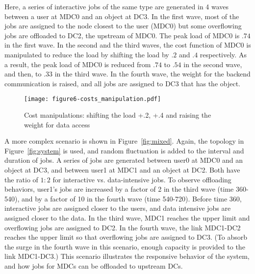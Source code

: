 Here, a series of interactive jobs of the same type are generated in
4 waves between a user at MDC0 and an object at DC3.
In the first wave,  most of the jobs are assigned to the node closest
to the user (MDC0) but some overflowing jobs are offloaded to DC2, the
upstream of MDC0.
The peak load of MDC0 is $.74$ in the first wave.
In the second and the third waves, the cost function of MDC0 is
manipulated to reduce the load by shifting the load by $.2$ and $.4$
respectively. As a result, the peak load of MDC0 is
reduced from $.74$ to $.54$ in the second wave, and then, to $.33$ in the
third wave.
In the fourth wave, the weight for the backend communication is
raised, and all jobs are assigned to DC3 that has the object.

\begin{figure}[tb]
  \begin{center}
    \texttt{[image: figure6-costs\_manipulation.pdf]}
    \vspace{-4.0ex}
    \caption{Cost manipulations: shifting the load +.2,
      +.4 and raising the weight for data access}
    \smallskip
    \raggedright
    \small
    \label{fig:lowering}
  \end{center}
\end{figure}


A more complex scenario is shown in Figure~\ref{fig:mixed}.
Again, the topology in Figure~\ref{fig:system} is used, and
random fluctuation is added to the interval and duration of jobs.
A series of jobs are generated
between user0 at MDC0 and an object at DC3, and
between user1 at MDC1 and an object at DC2.
Both have the ratio of $1:2$ for interactive vs. data-intensive jobs.
To observe offloading behaviors, user1's jobs are increased by a
factor of 2 in the third wave (time 360-540), and by a factor of 10 in
the fourth wave (time 540-720).
Before time 360, interactive jobs are assigned closer to the users,
and data intensive jobs are assigned closer to the data.
In the third wave, MDC1 reaches the upper limit and overflowing jobs are
assigned to DC2.
In the fourth wave, the link MDC1-DC2 reaches the upper limit so that
overflowing jobs are assigned to DC3.
(To absorb the surge in the fourth wave in this scenario, enough
capacity is provided to the link MDC1-DC3.)
This scenario illustrates the responsive behavior of the system,
and how jobs for MDCs can be offloaded to upstream DCs.


